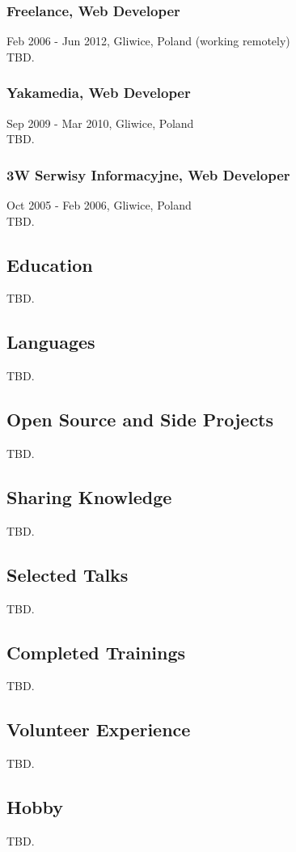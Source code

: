 \documentclass{article}
\begin{document}
      \subsubsection*{Freelance, Web Developer}
      Feb 2006 - Jun 2012, Gliwice, Poland (working remotely)\\[0.3em]
      TBD.

      \subsubsection*{Yakamedia, Web Developer}
      Sep 2009 - Mar 2010, Gliwice, Poland\\[0.3em]
      TBD.

      \subsubsection*{3W Serwisy Informacyjne, Web Developer}
      Oct 2005 - Feb 2006, Gliwice, Poland\\[0.3em]
      TBD.
      
    \subsection*{Education}
    TBD.
    
    \subsection*{Languages}
    TBD.
    
    \subsection*{Open Source and Side Projects}
    TBD.
    
    \subsection*{Sharing Knowledge}
    TBD.
    
    \subsection*{Selected Talks}
    TBD.
    
    \subsection*{Completed Trainings}
    TBD.
    
    \subsection*{Volunteer Experience}
    TBD.
    
    \subsection*{Hobby}
    TBD.
    
\end{document}
